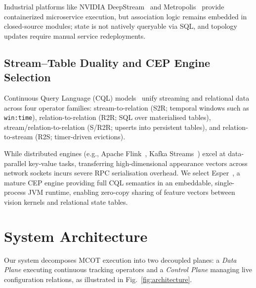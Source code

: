 \documentclass[conference]{IEEEtran}
\begin{document}
Industrial platforms like NVIDIA DeepStream~\cite{nvidia2024deepstream} and Metropolis~\cite{nvidia2025metropolis} provide containerized microservice execution, but association logic remains embedded in closed-source modules; state is not natively queryable via SQL, and topology updates require manual service redeployments.

\subsection{Stream--Table Duality and CEP Engine Selection}
Continuous Query Language (CQL) models~\cite{sax2018streams,DBLP:journals/vldb/ArasuBW06} unify streaming and relational data across four operator families: stream-to-relation (S2R; temporal windows such as \texttt{win:time}), relation-to-relation (R2R; SQL over materialised tables), stream/relation-to-relation (S/R2R; upserts into persistent tables), and relation-to-stream (R2S; timer-driven evictions).

While distributed engines (e.g., Apache Flink~\cite{carbone2015flink}, Kafka Streams~\cite{kreps2011kafka}) excel at data-parallel key-value tasks, transferring high-dimensional appearance vectors across network sockets incurs severe RPC serialisation overhead. We select Esper~\cite{espertech2024}, a mature CEP engine providing full CQL semantics in an embeddable, single-process JVM runtime, enabling zero-copy sharing of feature vectors between vision kernels and relational state tables.

\section{System Architecture}
\label{sec:architecture}

Our system decomposes MCOT execution into two decoupled planes: a \emph{Data Plane} executing continuous tracking operators and a \emph{Control Plane} managing live configuration relations, as illustrated in Fig.~\ref{fig:architecture}.
\end{document}
